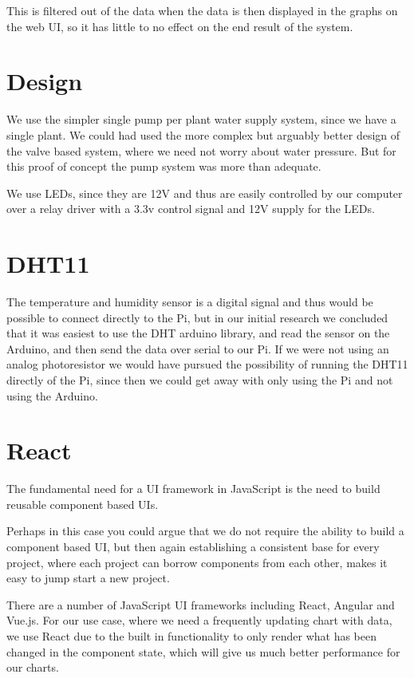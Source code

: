 \documentclass[a4paper,12pt,twoside,openright,titlepage]{book}
\begin{document}
This is filtered out of the data when the data is then displayed in the graphs on the web UI, so it has little to no effect on the end result of the system.

\section{Design}
We use the simpler single pump per plant water supply system, since we have a single plant.
We could had used the more complex but arguably better design of the valve based system, where we need not worry about water pressure. But for this proof of concept the pump system was more than adequate.

We use LEDs, since they are 12V and thus are easily controlled by our computer over a relay driver with a 3.3v control signal and 12V supply for the LEDs.

\section{DHT11}
The temperature and humidity sensor is a digital signal and thus would be possible to connect directly to the Pi, but in our initial research we concluded that it was easiest to use the DHT arduino library, and read the sensor on the Arduino, and then send the data over serial to our Pi. If we were not using an analog photoresistor we would have pursued the possibility of running the DHT11 directly of the Pi, since then we could get away with only using the Pi and not using the Arduino.

\section{React}
The fundamental need for a UI framework in JavaScript is the need to build reusable component based UIs.

Perhaps in this case you could argue that we do not require the ability to build a component based UI, but then again establishing a consistent base for every project, where each project can borrow components from each other, makes it easy to jump start a new project.

There are a number of JavaScript UI frameworks including React, Angular and Vue.js.
For our use case, where we need a frequently updating chart with data, we use React due to the built in functionality to only render what has been changed in the component state, which will give us much better performance for our charts.
\end{document}
